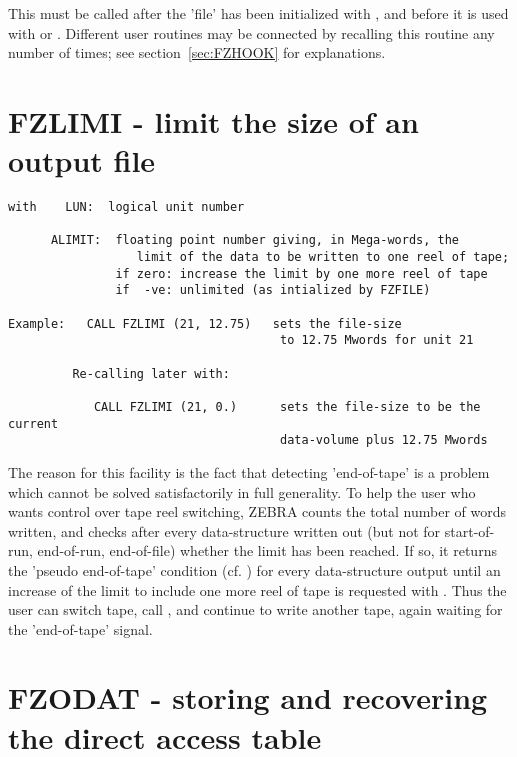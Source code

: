 This must be called after the 'file' has been initialized
with , and before it is used with  or .
Different user routines may be connected by recalling this
routine any number of times;
see section~\ref{sec:FZHOOK} for explanations.

\section{FZLIMI - limit the size of an output file}


\begin{verbatim}
with    LUN:  logical unit number

      ALIMIT:  floating point number giving, in Mega-words, the
                  limit of the data to be written to one reel of tape;
               if zero: increase the limit by one more reel of tape
               if  -ve: unlimited (as intialized by FZFILE)

Example:   CALL FZLIMI (21, 12.75)   sets the file-size
                                      to 12.75 Mwords for unit 21

         Re-calling later with:

            CALL FZLIMI (21, 0.)      sets the file-size to be the current
                                      data-volume plus 12.75 Mwords
\end{verbatim}

The reason for this facility is the fact that detecting 'end-of-tape'
is a problem which cannot be solved satisfactorily in full
generality.
To help the user who wants control over tape reel switching,
ZEBRA counts the total number of words written,
and checks after every data-structure written out
(but not for start-of-run, end-of-run, end-of-file)
whether the limit has been reached.
If so, it returns the 'pseudo end-of-tape' condition (cf. )
for every data-structure output until an increase of the limit
to include one more reel of tape is requested with .
Thus the user can switch tape,
call ,
and continue to write another tape,
again waiting for the 'end-of-tape' signal.

\section{FZODAT - storing and recovering the direct access table}

